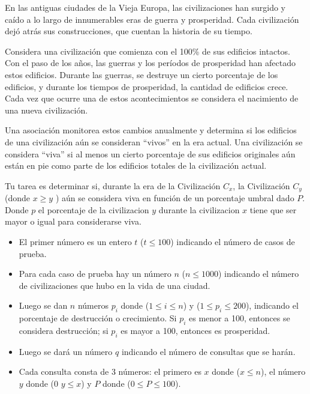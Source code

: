 
En las antiguas ciudades de la Vieja Europa, las civilizaciones han surgido y caído a lo largo de innumerables eras de guerra y prosperidad. Cada civilización dejó atrás sus construcciones, que cuentan la historia de su tiempo.

Considera una civilización que comienza con el 100\% de sus edificios intactos. Con el paso de los años, las guerras y los períodos de prosperidad han afectado estos edificios. Durante las guerras, se destruye un cierto porcentaje de los edificios, y durante los tiempos de prosperidad, la cantidad de edificios crece. Cada vez que ocurre una de estos acontecimientos se considera el nacimiento de una nueva civilización.

Una asociación monitorea estos cambios anualmente y determina si los edificios de una civilización aún se consideran ``vivos'' en la era actual. Una civilización se considera ``viva'' si al menos un cierto porcentaje de sus edificios originales aún están en pie como parte de los edificios totales de la civilización actual.

Tu tarea es determinar si, durante la era de la Civilización $C_x$, la Civilización $C_y$ (donde $x \geq y$ ) aún se considera viva en función de un porcentaje umbral dado $P$. Donde $p$ el porcentaje de la civilizacion $y$ durante la civilizacion $x$ tiene que ser mayor o igual para considerarse viva.


\begin{itemize}
    \item El primer número es un entero $t$ ($t \leq 100$) indicando el número de casos de prueba.
    \item Para cada caso de prueba hay un número $n$ ($n \leq 1000$) indicando el número de civilizaciones que hubo en la vida de una ciudad.
    \item Luego se dan $n$ números $p_i$ donde ($1 \leq i \leq n$) y ($1 \leq p_i \leq 200$), indicando el porcentaje de destrucción o crecimiento. Si $p_i$ es menor a 100, entonces se considera destrucción; si $p_i$ es mayor a 100, entonces es prosperidad.
    \item Luego se dará un número $q$ indicando el número de consultas que se harán.
    \item Cada consulta consta de 3 números: el primero es $x$ donde ($x \leq n$), el número $y$ donde (0 \leq $y \leq x$) y $P$ donde ($0 \leq P \leq 100$).
\end{itemize}

